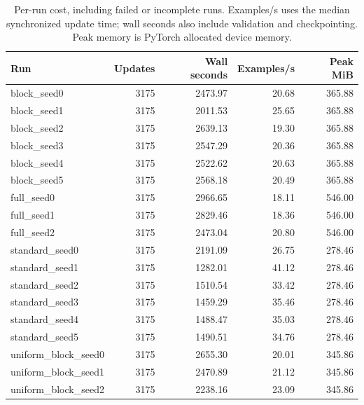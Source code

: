 \begin{table}[ht]\centering\scriptsize
\begin{tabular}{lrrrr}
\toprule
Run & Updates & Wall seconds & Examples/s & Peak MiB \\
\midrule
block\_seed0 & 3175 & 2473.97 & 20.68 & 365.88 \\
block\_seed1 & 3175 & 2011.53 & 25.65 & 365.88 \\
block\_seed2 & 3175 & 2639.13 & 19.30 & 365.88 \\
block\_seed3 & 3175 & 2547.29 & 20.36 & 365.88 \\
block\_seed4 & 3175 & 2522.62 & 20.63 & 365.88 \\
block\_seed5 & 3175 & 2568.18 & 20.49 & 365.88 \\
full\_seed0 & 3175 & 2966.65 & 18.11 & 546.00 \\
full\_seed1 & 3175 & 2829.46 & 18.36 & 546.00 \\
full\_seed2 & 3175 & 2473.04 & 20.80 & 546.00 \\
standard\_seed0 & 3175 & 2191.09 & 26.75 & 278.46 \\
standard\_seed1 & 3175 & 1282.01 & 41.12 & 278.46 \\
standard\_seed2 & 3175 & 1510.54 & 33.42 & 278.46 \\
standard\_seed3 & 3175 & 1459.29 & 35.46 & 278.46 \\
standard\_seed4 & 3175 & 1488.47 & 35.03 & 278.46 \\
standard\_seed5 & 3175 & 1490.51 & 34.76 & 278.46 \\
uniform\_block\_seed0 & 3175 & 2655.30 & 20.01 & 345.86 \\
uniform\_block\_seed1 & 3175 & 2470.89 & 21.12 & 345.86 \\
uniform\_block\_seed2 & 3175 & 2238.16 & 23.09 & 345.86 \\
\bottomrule
\end{tabular}
\caption{Per-run cost, including failed or incomplete runs. Examples/s uses the median synchronized update time; wall seconds also include validation and checkpointing. Peak memory is PyTorch allocated device memory.}\end{table}
